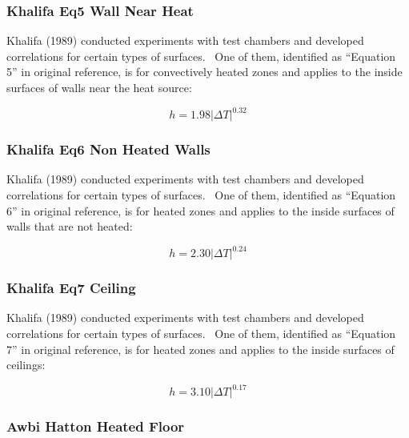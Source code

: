 \subsubsection{Khalifa Eq5 Wall Near Heat}\label{khalifa-eq5-wall-near-heat}

Khalifa (1989) conducted experiments with test chambers and developed correlations for certain types of surfaces.~ One of them, identified as ``Equation 5'' in original reference, is for convectively heated zones and applies to the inside surfaces of walls near the heat source:

\begin{equation}
h = 1.98{\left| {\Delta T} \right|^{0.32}}
\end{equation}

\subsubsection{Khalifa Eq6 Non Heated Walls}\label{khalifa-eq6-non-heated-walls}

Khalifa (1989) conducted experiments with test chambers and developed correlations for certain types of surfaces.~ One of them, identified as ``Equation 6'' in original reference, is for heated zones and applies to the inside surfaces of walls that are not heated:

\begin{equation}
h = 2.30{\left| {\Delta T} \right|^{0.24}}
\end{equation}

\subsubsection{Khalifa Eq7 Ceiling}\label{khalifa-eq7-ceiling}

Khalifa (1989) conducted experiments with test chambers and developed correlations for certain types of surfaces.~ One of them, identified as ``Equation 7'' in original reference, is for heated zones and applies to the inside surfaces of ceilings:

\begin{equation}
h = 3.10{\left| {\Delta T} \right|^{0.17}}
\end{equation}

\subsubsection{Awbi Hatton Heated Floor}\label{awbi-hatton-heated-floor}

